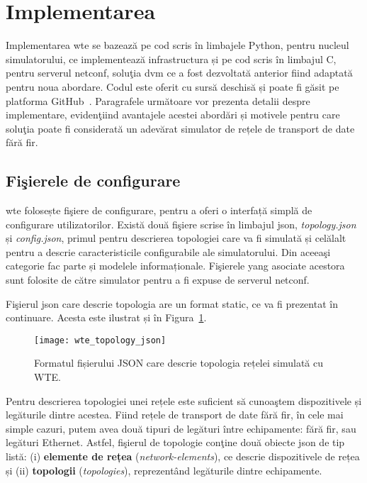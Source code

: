 \section{Implementarea}

Implementarea \gls{wte} se bazează pe cod scris în limbajele Python, pentru nucleul simulatorului, ce implementează infrastructura și pe cod scris în limbajul C, pentru serverul \gls{netconf}, soluţia \gls{dvm} ce a fost dezvoltată anterior fiind adaptată pentru noua abordare. Codul este oferit cu sursă deschisă și poate fi găsit pe platforma GitHub~\cite{wte2017}. Paragrafele următoare vor prezenta detalii despre implementare, evidenţiind avantajele acestei abordări și motivele pentru care soluţia poate fi considerată un adevărat simulator de rețele de transport de date fără fir. 

\subsection{Fişierele de configurare}

\gls{wte} folosește fişiere de configurare, pentru a oferi o interfață simplă de configurare utilizatorilor. Există două fişiere scrise în limbajul \gls{json}, \textit{topology.json} și \textit{config.json}, primul pentru descrierea topologiei care va fi simulată și celălalt pentru a descrie caracteristicile configurabile ale simulatorului. Din aceeaşi categorie fac parte și modelele informaționale. Fişierele \gls{yang} asociate acestora sunt folosite de către simulator pentru a fi expuse de serverul \gls{netconf}.

Fişierul \gls{json} care descrie topologia are un format static, ce va fi prezentat în continuare. Acesta este ilustrat și în Figura~\ref{fig:wte_topology_json}.

\begin{figure}[h]
	\centering
	\texttt{[image: wte\_topology\_json]}
	\caption{Formatul fișierului JSON care descrie topologia rețelei simulată cu WTE.}
	\label{fig:wte_topology_json}
\end{figure}

Pentru descrierea topologiei unei rețele este suficient să cunoaştem dispozitivele și legăturile dintre acestea. Fiind rețele de transport de date fără fir, în cele mai simple cazuri, putem avea două tipuri de legături între echipamente: fără fir, sau legături Ethernet. Astfel, fişierul de topologie conţine două obiecte \gls{json} de tip listă: (i) \textbf{elemente de rețea} (\textit{network-elements}), ce descrie dispozitivele de rețea și (ii) \textbf{topologii} (\textit{topologies}), reprezentând legăturile dintre echipamente.

